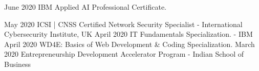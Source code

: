 



\begin{cvskills}
  \cvskill
    {June 2020} %
    {IBM Applied AI Professional Certificate.} %

  \cvskill
    {May 2020} %
    {ICSI | CNSS Certified Network Security Specialist - International Cybersecurity Institute, UK} %
  \cvskill
    {April 2020} %
    {IT Fundamentals Specialization. - IBM} %
  \cvskill
    {April 2020} %
    {WD4E: Basics of Web Development \& Coding Specialization.} %
  \cvskill
    {March 2020} %
    {Entrepreneurship Development Accelerator Program - Indian School of Business} %

\end{cvskills}